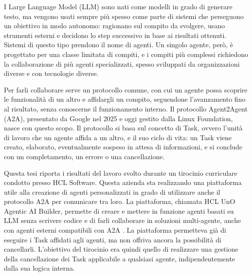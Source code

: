 I Large Language Model (LLM) sono nati come modelli in grado di generare testo, ma vengono usati sempre più spesso come parte di sistemi che
perseguono un obiettivo in modo autonomo: ragionano sul compito da svolgere, usano strumenti esterni e decidono lo step successivo in base ai
risultati ottenuti. Sistemi di questo tipo prendono il nome di agenti. Un singolo agente, però, è progettato per una classe limitata di compiti,
e i compiti più complessi richiedono la collaborazione di più agenti specializzati, spesso sviluppati da organizzazioni diverse e con tecnologie diverse.

Per farli collaborare serve un protocollo comune, con cui un agente possa scoprire le funzionalità di un altro e affidargli un compito, seguendone
l'avanzamento fino al risultato, senza conoscerne il funzionamento interno. Il protocollo Agent2Agent (A2A), presentato da Google nel 2025 e oggi
gestito dalla Linux Foundation, nasce con questo scopo. Il protocollo si basa sul concetto di Task, ovvero l'unità di lavoro che un agente affida
 a un altro, e il suo ciclo di vita: un Task viene creato, elaborato, eventualmente sospeso in attesa di informazioni, e si conclude con un completamento,
  un errore o una cancellazione.

Questa tesi riporta i risultati del lavoro svolto durante un tirocinio curriculare condotto presso HCL Software. Questa azienda sta realizzando una piattaforma utile alla creazione di agenti personalizzati in grado di utilizzare
anche il protocollo A2A per comunicare tra loro. La piattaforma, chiamata HCL UnO Agentic AI Builder, permette di creare e mettere in funzione agenti basati su LLM senza scrivere codice e di farli collaborare in soluzioni multi-agente, anche con agenti esterni compatibili con A2A \cite{hcluno}. La piattaforma permetteva già di eseguire i Task affidati agli agenti, ma non offriva ancora la possibilità di cancellarli.
L'obiettivo del tirocinio era quindi quello di realizzare una gestione della cancellazione dei Task applicabile a qualsiasi agente, indipendentemente dalla sua logica interna.

